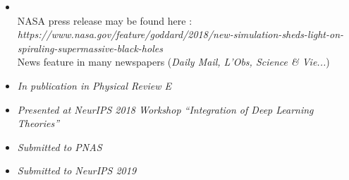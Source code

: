 \documentclass[a4paper,12pt]{moderncv}
\begin{document}
\vspace{0.3cm}
\vspace{0.3cm}
\begin{itemize}
    \item {} \newline \\
    \vspace{0.1cm}
    NASA press release may be found here : \textit{https://www.nasa.gov/feature/goddard/2018/new-simulation-sheds-light-on-spiraling-supermassive-black-holes} \newline \\
    \vspace{0.1cm}
    News feature in many newspapers (\textit{Daily Mail, L'Obs, Science \& Vie...}) \newline

    \item {} \newline
    \vspace{0.1cm}
    \textit{In publication in Physical Review E}
    \vspace{0.3cm}
    
    \item {} \newline
    \vspace{0.1cm}
    \textit{Presented at NeurIPS 2018 Workshop ``Integration of Deep Learning Theories''}
    \vspace{0.3cm}
    
    \item {} \newline
    \vspace{0.1cm}
    \textit{Submitted to PNAS}
    \vspace{0.3cm}
    
    \item {} \newline
    \vspace{0.1cm}
    \textit{Submitted to NeurIPS 2019}
\end{itemize}

\vspace{0.5cm}

\end{document}
